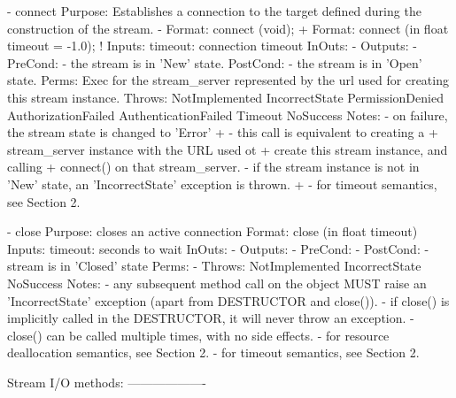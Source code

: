 \begin{myspec}
    - connect
      Purpose:  Establishes a connection to the target defined
                during the construction of the stream.
-     Format:   connect              (void);
+     Format:   connect              (in float timeout = -1.0);
!     Inputs:   timeout:              connection timeout
      InOuts:   -
      Outputs:  -
      PreCond:  - the stream is in 'New' state.
      PostCond: - the stream is in 'Open' state.
      Perms:    Exec for the stream_server represented by the
                url used for creating this stream instance.
      Throws:   NotImplemented
                IncorrectState
                PermissionDenied
                AuthorizationFailed
                AuthenticationFailed
                Timeout
                NoSuccess
      Notes:    - on failure, the stream state is changed to
                  'Error'
+               - this call is equivalent to creating a
+                 stream_server instance with the URL used ot
+                 create this stream instance, and calling
+                 connect() on that stream_server.
                - if the stream instance is not in 'New' state,
                  an 'IncorrectState' exception is thrown.
+               - for timeout semantics, see Section 2.
 
 
    - close
      Purpose:  closes an active connection
      Format:   close                (in float timeout)
      Inputs:   timeout:              seconds to wait
      InOuts:   -
      Outputs:  -
      PreCond:  -
      PostCond: - stream is in 'Closed' state
      Perms:    -
      Throws:   NotImplemented
                IncorrectState
                NoSuccess
      Notes:    - any subsequent method call on the object
                  MUST raise an 'IncorrectState' exception
                  (apart from DESTRUCTOR and close()).
                - if close() is implicitly called in the
                  DESTRUCTOR, it will never throw an exception.
                - close() can be called multiple times, with no
                  side effects.
                - for resource deallocation semantics, see 
                  Section 2.
                - for timeout semantics, see Section 2.
 
 
    Stream I/O methods:
    -------------------
 

\end{myspec}
